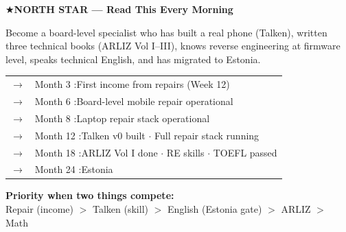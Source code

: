 \label{sec:northstar}
\vspace{0.4cm}
\begin{northstarbox}
\textbf{\color{arlizblue}\large $\bigstar$\enspace NORTH STAR --- Read This Every Morning}

\vspace{6pt}
Become a board-level specialist who has built a real phone (Talken), written three
technical books (ARLIZ Vol I--III), knows reverse engineering at firmware level, speaks
technical English, and has migrated to Estonia.

\vspace{6pt}
\begin{tabular}{@{\hspace{4pt}}ll}
  \textbf{\color{arlizblue}$\to$} & Month 3\phantom{0} :\enspace First income from repairs (Week 12) \\
  \textbf{\color{arlizblue}$\to$} & Month 6\phantom{0} :\enspace Board-level mobile repair operational \\
  \textbf{\color{arlizblue}$\to$} & Month 8\phantom{0} :\enspace Laptop repair stack operational \\
  \textbf{\color{arlizblue}$\to$} & Month 12 :\enspace Talken v0 built $\cdot$ Full repair stack running \\
  \textbf{\color{arlizblue}$\to$} & Month 18 :\enspace ARLIZ Vol I done $\cdot$ RE skills $\cdot$ TOEFL passed \\
  \textbf{\color{arlizblue}$\to$} & Month 24 :\enspace Estonia \\
\end{tabular}

\vspace{6pt}
\textbf{\color{arlizgold}Priority when two things compete:}\\
Repair (income) $>$ Talken (skill) $>$ English (Estonia gate) $>$ ARLIZ $>$ Math
\end{northstarbox}